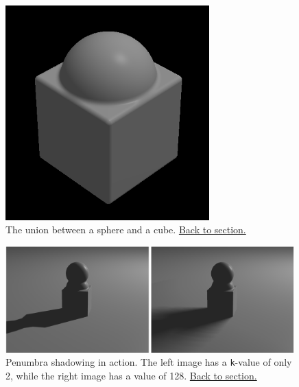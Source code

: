 \documentclass[abstract=off,oneside]{scrreprt}
\begin{document}
\begin{figure}[htb]
\centering
\includegraphics[width=0.70\textwidth]{./img/union.png}
\caption*{\label{fig:union}The union between a sphere and a cube. \hyperref[sec:creatingascene]{Back to section.}}
\end{figure}

\begin{figure}[htb]
\centering
\includegraphics[width=0.99\textwidth]{./img/penumbra.png}
\caption*{\label{fig:penumbra}Penumbra shadowing in action. The left image has a \verb~k~-value of only 2, while the right image has a value of 128. \hyperref[sec:shadows]{Back to section.}}
\end{figure}
\end{document}
